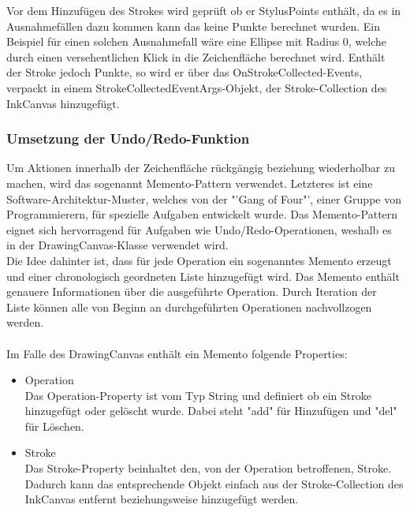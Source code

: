 Vor dem Hinzufügen des Strokes wird geprüft ob er StylusPoints enthält, da es in Ausnahmefällen dazu kommen kann das keine Punkte berechnet wurden. Ein Beispiel für einen solchen Ausnahmefall wäre eine Ellipse mit Radius 0, welche durch einen versehentlichen Klick in die Zeichenfläche berechnet wird. Enthält der Stroke jedoch Punkte, so wird er über das OnStrokeCollected-Events, verpackt in einem StrokeCollectedEventArgs-Objekt, der Stroke-Collection des InkCanvas hinzugefügt. 

\subsubsection{Umsetzung der Undo/Redo-Funktion}
Um Aktionen innerhalb der Zeichenfläche rückgängig beziehung wiederholbar zu machen, wird das sogenannt Memento-Pattern verwendet. Letzteres ist eine Software-Architektur-Muster, welches von der "'Gang of Four"', einer Gruppe von Programmierern, für spezielle Aufgaben entwickelt wurde. Das Memento-Pattern eignet sich hervorragend für Aufgaben wie Undo/Redo-Operationen, weshalb es in der DrawingCanvas-Klasse verwendet wird.\\
Die Idee dahinter ist, dass für jede Operation ein sogenanntes Memento erzeugt und einer chronologisch geordneten Liste hinzugefügt wird. Das Memento enthält genauere Informationen über die ausgeführte Operation. Durch Iteration der Liste können alle von Beginn an durchgeführten Operationen nachvollzogen werden.\\
\\
Im Falle des DrawingCanvas enthält ein Memento folgende Properties:
\begin{itemize}
\item Operation\\
Das Operation-Property ist vom Typ String und definiert ob ein Stroke hinzugefügt oder gelöscht wurde. Dabei steht "add" für Hinzufügen und "del" für Löschen.
\item Stroke\\
Das Stroke-Property beinhaltet den, von der Operation betroffenen, Stroke. Dadurch kann das entsprechende Objekt einfach aus der Stroke-Collection des InkCanvas entfernt beziehungsweise hinzugefügt werden.
\end{itemize}

